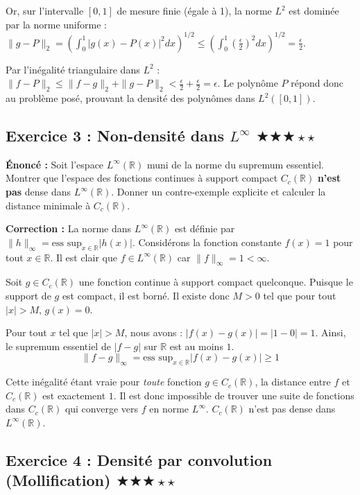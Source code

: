 \documentclass[11pt,a4paper]{article}
\begin{document}
Or, sur l'intervalle $[0,1]$ de mesure finie (égale à 1), la norme $L^2$ est dominée par la norme uniforme :
$\| g - P \|_2 = \left( \int_0^1 |g(x) - P(x)|^2 dx \right)^{1/2} \le \left( \int_0^1 \left(\frac{\epsilon}{2}\right)^2 dx \right)^{1/2} = \frac{\epsilon}{2}$.

Par l'inégalité triangulaire dans $L^2$ :
$\| f - P \|_2 \le \| f - g \|_2 + \| g - P \|_2 < \frac{\epsilon}{2} + \frac{\epsilon}{2} = \epsilon$.
Le polynôme $P$ répond donc au problème posé, prouvant la densité des polynômes dans $L^2([0,1])$.


\subsection*{Exercice 3 : Non-densité dans $L^\infty$ \quad $\bigstar\bigstar\bigstar\star\star$}

\textbf{Énoncé :}
Soit l'espace $L^\infty(\mathbb{R})$ muni de la norme du supremum essentiel.
Montrer que l'espace des fonctions continues à support compact $C_c(\mathbb{R})$ \textbf{n'est pas} dense dans $L^\infty(\mathbb{R})$.
Donner un contre-exemple explicite et calculer la distance minimale à $C_c(\mathbb{R})$.

\textbf{Correction :}
La norme dans $L^\infty(\mathbb{R})$ est définie par $\| h \|_\infty = \text{ess sup}_{x \in \mathbb{R}} |h(x)|$.
Considérons la fonction constante $f(x) = 1$ pour tout $x \in \mathbb{R}$. Il est clair que $f \in L^\infty(\mathbb{R})$ car $\| f \|_\infty = 1 < \infty$.

Soit $g \in C_c(\mathbb{R})$ une fonction continue à support compact quelconque.
Puisque le support de $g$ est compact, il est borné. Il existe donc $M > 0$ tel que pour tout $|x| > M$, $g(x) = 0$.

Pour tout $x$ tel que $|x| > M$, nous avons :
$|f(x) - g(x)| = |1 - 0| = 1$.
Ainsi, le supremum essentiel de $|f - g|$ sur $\mathbb{R}$ est au moins $1$.
$$ \| f - g \|_\infty = \text{ess sup}_{x \in \mathbb{R}} |f(x) - g(x)| \ge 1 $$

Cette inégalité étant vraie pour \textit{toute} fonction $g \in C_c(\mathbb{R})$, la distance entre $f$ et $C_c(\mathbb{R})$ est exactement $1$.
Il est donc impossible de trouver une suite de fonctions dans $C_c(\mathbb{R})$ qui converge vers $f$ en norme $L^\infty$. $C_c(\mathbb{R})$ n'est pas dense dans $L^\infty(\mathbb{R})$.


\subsection*{Exercice 4 : Densité par convolution (Mollification) \quad $\bigstar\bigstar\bigstar\star\star$}
\end{document}
